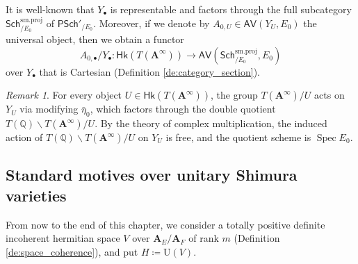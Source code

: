 \documentclass[12pt]{amsart}
\numberwithin{equation}{section}
\theoremstyle{plain}
\theoremstyle{definition}
\theoremstyle{remark}
\newtheorem{remark}[proposition]{Remark}
\renewcommand{\b}[1]{\mathbf{#1}}
\renewcommand{\d}[1]{\mathbb{#1}}
\renewcommand{\r}[1]{\mathrm{#1}}
\renewcommand{\sf}[1]{\mathsf{#1}}
\renewcommand{\(}{\left(}
\renewcommand{\)}{\right)}
\newcommand{\bA}{\b A}
\newcommand{\dQ}{\d Q}
\newcommand{\rU}{\r U}
\newcommand{\sfP}{\sf P}
\newcommand{\smp}{\r{sm.proj}}
\newcommand{\Sch}{\sf{Sch}}
\newcommand{\AV}{\sf{AV}}
\newcommand{\Hk}{\sf{Hk}}
\DeclareMathOperator{\Spec}{Spec}
\begin{document}
It is well-known that $Y_\bullet$ is representable and factors through the full subcategory $\Sch^\smp_{/E_0}$ of $\sfP\Sch'_{/E_0}$. Moreover, if we denote by $A_{0,U}\in\AV(Y_U,E_0)$ the universal object, then we obtain a functor
\[
A_{0,\bullet}/Y_\bullet\colon\Hk(T(\bA^\infty))\to\AV(\Sch^\smp_{/E_0},E_0)
\]
over $Y_\bullet$ that is Cartesian (Definition \ref{de:category_section}).

\begin{remark}\label{re:moduli_auxiliary}
For every object $U\in\Hk(T(\bA^\infty))$, the group $T(\bA^\infty)/U$ acts on $Y_U$ via modifying $\bar\eta_0$, which factors through the double quotient $T(\dQ)\backslash T(\bA^\infty)/U$. By the theory of complex multiplication, the induced action of $T(\dQ)\backslash T(\bA^\infty)/U$ on $Y_U$ is free, and the quotient scheme is $\Spec E_0$.
\end{remark}







\subsection{Standard motives over unitary Shimura varieties}
\label{ss:motive_standard}

From now to the end of this chapter, we consider a totally positive definite incoherent hermitian space $V$ over $\bA_E/\bA_F$ of rank $m$ (Definition \ref{de:space_coherence}), and put $H\coloneqq\rU(V)$.
\end{document}
